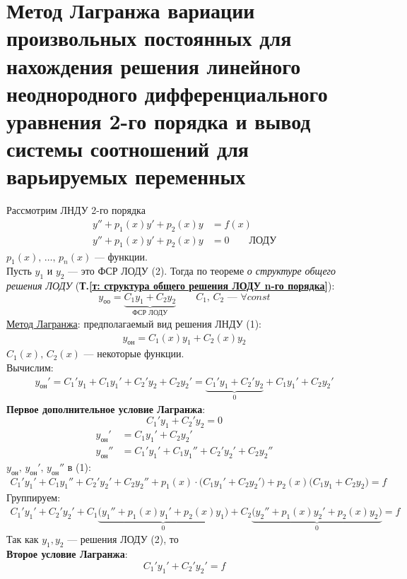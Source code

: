 \section{Метод Лагранжа вариации произвольных постоянных для нахождения решения линейного неоднородного дифференциального уравнения 2-го порядка и вывод системы соотношений для варьируемых переменных}
\setcounter{equation}{0}
Рассмотрим ЛНДУ 2-го порядка
\begin{align}
    y'' + p_1(x)y' + p_2(x)y &= f(x) \\
    y'' + p_1(x)y' + p_2(x)y &= 0\qquad \text{ЛОДУ}
\end{align}
$p_1(x),\, \ldots,\, p_n(x)$ --- функции.\\
Пусть $y_1$ и $y_2$ --- это ФСР ЛОДУ (2). Тогда по теореме \textit{о структуре общего решения ЛОДУ} (\textbf{Т.\ref{т: структура общего решения ЛОДУ n-го порядка}}):
\[
    y_\text{оо} = \underbrace{C_1y_1 + C_2y_2}_{\text{ФСР ЛОДУ}}\qquad C_1,\, C_2 \text{ --- } \forall const
\]
\underline{Метод Лагранжа}: предполагаемый вид решения ЛНДУ (1):
\begin{gather}
    y_{\text{он}} = C_1(x)y_1 + C_2(x)y_2
\end{gather}
$C_1(x),\, C_2(x)$ --- некоторые функции. \\
Вычислим:
\begin{align*}
    y_{\text{он}}' = C_1'y_1 + C_1y_1' + C_2'y_2 + C_2y_2' = \underbrace{C_1'y_1 + C_2'y_2}_0 + C_1y_1' + C_2y_2'
\end{align*}
\textbf{Первое дополнительное условие Лагранжа}:
\[
    \boxed{C_1'y_1 + C_2'y_2 = 0}
\]
\begin{align*}
    y_{\text{он}}' &= C_1y_1' + C_2y_2' \\
    y_{\text{он}}'' &= C_1'y_1' + C_1y_1'' + C_2'y_2' + C_2y_2''
\end{align*}
$y_{\text{он}},\, y_{\text{он}}',\, y_{\text{он}}''$ в (1):
\begin{align*}
    C_1'y_1' + C_1y_1'' + C_2'y_2' + C_2y_2'' + p_1(x) \cdot \big(C_1y_1' + C_2y_2'\big) + p_2(x) \big(C_1y_1 + C_2y_2\big) = f
\end{align*}
Группируем:
\begin{align*}
    C_1'y_1' + C_2'y_2' + C_1 \underbrace{\Big(y_1'' + p_1(x)y_1' + p_2(x)y_1\Big)}_0 + C_2 \underbrace{\Big(y_2'' + p_1(x)y_2' + p_2(x)y_2\Big)}_0 = f
\end{align*}
Так как $y_1,y_2$ --- решения ЛОДУ (2), то\\
\textbf{Второе условие Лагранжа}:
\[
    \boxed{C_1'y_1' + C_2'y_2' = f}
\]
